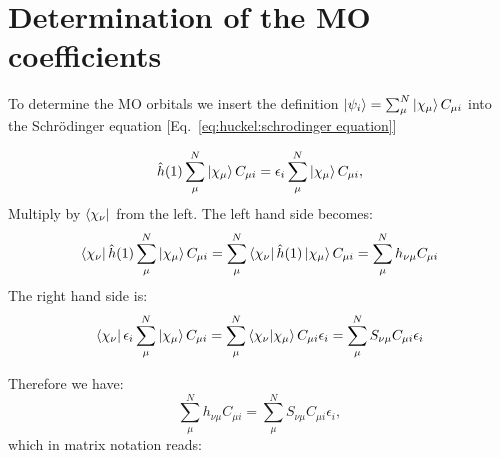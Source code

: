 \documentclass[../Main/chem532-notes.tex]{subfiles}
\begin{document}
\section{Determination of the MO coefficients}
To determine the MO orbitals we insert the definition $\ket{\psi_i} = \sum_\mu^{N} \ket{\chi_\mu} C_{\mu i}$ into the Schr\"{o}dinger equation [Eq.~\eqref{eq:huckel:schrodinger equation}] 

\begin{equation}
\hat{h}(1) \sum_\mu^{N} \ket{ \chi_\mu} C_{\mu i}= \epsilon_i \sum_\mu^{N} \ket{ \chi_\mu} C_{\mu i},
\end{equation}
Multiply by $\bra{\chi_\nu}$ from the left.  The left hand side becomes:
\begin{equation}
\bra{\chi_\nu}\hat{h}(1) \sum_\mu^{N} \ket{ \chi_\mu} C_{\mu i}
=  \sum_\mu^{N}  \bra{\chi_\nu}\hat{h}(1)\ket{ \chi_\mu} C_{\mu i} =  \sum_\mu^{N}  h_{\nu\mu} C_{\mu i}
\end{equation}
The right hand side is:
\begin{equation}
\bra{\chi_\nu}\epsilon_i \sum_\mu^{N} \ket{ \chi_\mu} C_{\mu i} = 
\sum_\mu^{N} \braket{\chi_\nu|\chi_\mu} C_{\mu i}  \epsilon_i 
= \sum_\mu^{N}S_{\nu\mu} C_{\mu i}  \epsilon_i 
\end{equation}

Therefore we have:
\begin{equation}
\sum_\mu^{N}  h_{\nu\mu} C_{\mu i} = \sum_\mu^{N}S_{\nu\mu} C_{\mu i}  \epsilon_i,
\end{equation}
which in matrix notation reads:
\end{document}
